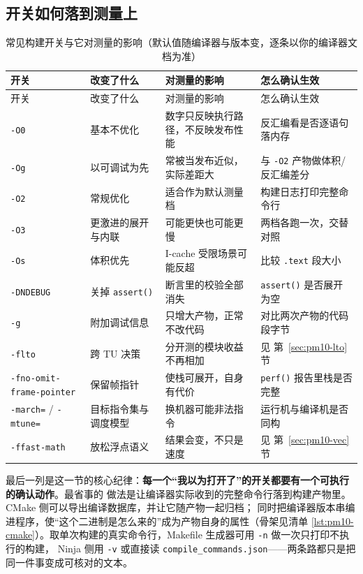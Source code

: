 \documentclass[12pt,a4paper,fontset=fandol]{ctexbook}
\newcommand{\Fn}[1]{\texttt{#1()}}
\newcommand{\Tp}[1]{\texttt{#1}}
\newcommand{\Bk}{\discretionary{}{}{}}
\begin{document}
\subsection{开关如何落到测量上}

\begin{longtable}{>{\raggedright\arraybackslash}p{} >{\raggedright\arraybackslash}p{} >{\raggedright\arraybackslash}p{} >{\raggedright\arraybackslash}p{}}
\caption{常见构建开关与它对测量的影响（默认值随编译器与版本变，逐条以你的编译器文档为准）}
\label{tab:pm10-flag}\\
\toprule
开关 & 改变了什么 & 对测量的影响 & 怎么确认生效 \\
\midrule
\endfirsthead
\toprule
开关 & 改变了什么 & 对测量的影响 & 怎么确认生效 \\
\midrule
\endhead
\Tp{-O0} & 基本不优化 & 数字只反映执行路径，不反映发布性能 & 反汇编看是否逐语句落内存 \\
\Tp{-Og} & 以可调试为先 & 常被当发布近似，实际差距大 & 与 \Tp{-O2} 产物做体积/反汇编差分 \\
\Tp{-O2} & 常规优化 & 适合作为默认测量档 & 构建日志打印完整命令行 \\
\Tp{-O3} & 更激进的展开与内联 & 可能更快也可能更慢 & 两档各跑一次，交替对照 \\
\Tp{-Os} & 体积优先 & I-cache 受限场景可能反超 & 比较 \Tp{.text} 段大小 \\
\Tp{-DNDEBUG} & 关掉 \Fn{assert} & 断言里的校验全部消失 & \Fn{assert} 是否展开为空 \\
\Tp{-g} & 附加调试信息 & 只增大产物，正常不改代码 & 对比两次产物的代码段字节 \\
\Tp{-flto} & 跨 TU 决策 & 分开测的模块收益不再相加 & 见 第~\ref{sec:pm10-lto} 节 \\
\Tp{-fno-omit-}{\newline}\Tp{frame-{\Bk}pointer} & 保留帧指针 & 使栈可展开，自身有代价 & \Fn{perf} 报告里栈是否完整 \\
\Tp{-march=} / \Tp{-mtune=} & 目标指令集与调度模型 & 换机器可能非法指令 & 运行机与编译机是否同构 \\
\Tp{-ffast-math} & 放松浮点语义 & 结果会变，不只是速度 & 见 第~\ref{sec:pm10-vec} 节 \\
\bottomrule
\end{longtable}

最后一列是这一节的核心纪律：\textbf{每一个``我以为打开了''的开关都要有一个可执行的确认动作}。最省事的
做法是让编译器实际收到的完整命令行落到构建产物里。CMake 侧可以导出编译数据库，并让它随产物一起归档；
同时把编译器版本串编进程序，使``这个二进制是怎么来的''成为产物自身的属性（骨架见清单
\ref{lst:pm10-cmake}）。取单次构建的真实命令行，Makefile 生成器可用 \Tp{-n} 做一次只打印不执行的构建，
Ninja 侧用 \Tp{-v} 或直接读 \Tp{compile\_{\Bk}commands.json}——两条路都只是把同一件事变成可核对的文本。
\end{document}
